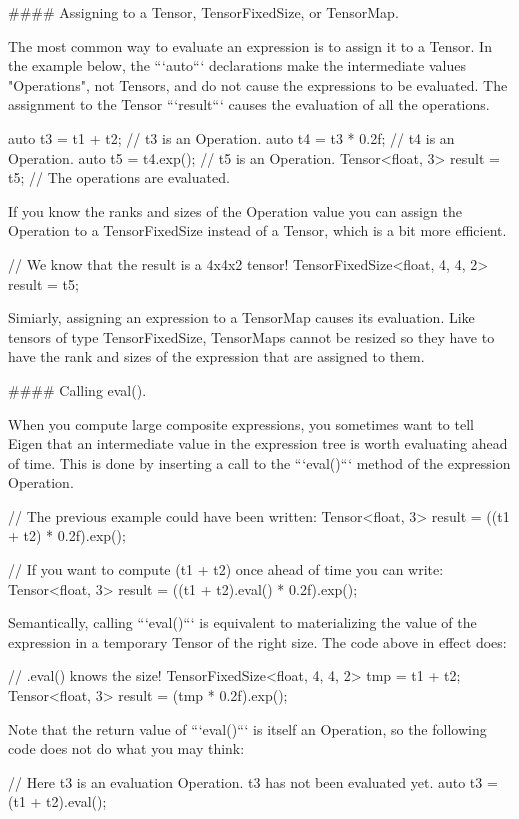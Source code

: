 \begin{DoxyCode}
#### Assigning to a Tensor, TensorFixedSize, or TensorMap.

The most common way to evaluate an expression is to assign it to a Tensor.  In
the example below, the ```auto``` declarations make the intermediate values
"Operations", not Tensors, and do not cause the expressions to be evaluated.
The assignment to the Tensor ```result``` causes the evaluation of all the
operations.

    auto t3 = t1 + t2;             // t3 is an Operation.
    auto t4 = t3 * 0.2f;           // t4 is an Operation.
    auto t5 = t4.exp();            // t5 is an Operation.
    Tensor<float, 3> result = t5;  // The operations are evaluated.

If you know the ranks and sizes of the Operation value you can assign the
Operation to a TensorFixedSize instead of a Tensor, which is a bit more
efficient.

    // We know that the result is a 4x4x2 tensor!
    TensorFixedSize<float, 4, 4, 2> result = t5;

Simiarly, assigning an expression to a TensorMap causes its evaluation.  Like
tensors of type TensorFixedSize, TensorMaps cannot be resized so they have to
have the rank and sizes of the expression that are assigned to them.

#### Calling eval().

When you compute large composite expressions, you sometimes want to tell Eigen
that an intermediate value in the expression tree is worth evaluating ahead of
time.  This is done by inserting a call to the ```eval()``` method of the
expression Operation.

    // The previous example could have been written:
    Tensor<float, 3> result = ((t1 + t2) * 0.2f).exp();

    // If you want to compute (t1 + t2) once ahead of time you can write:
    Tensor<float, 3> result = ((t1 + t2).eval() * 0.2f).exp();

Semantically, calling ```eval()``` is equivalent to materializing the value of
the expression in a temporary Tensor of the right size.  The code above in
effect does:

    // .eval() knows the size!
    TensorFixedSize<float, 4, 4, 2> tmp = t1 + t2;
    Tensor<float, 3> result = (tmp * 0.2f).exp();

Note that the return value of ```eval()``` is itself an Operation, so the
following code does not do what you may think:

    // Here t3 is an evaluation Operation.  t3 has not been evaluated yet.
    auto t3 = (t1 + t2).eval();


\end{DoxyCode}
